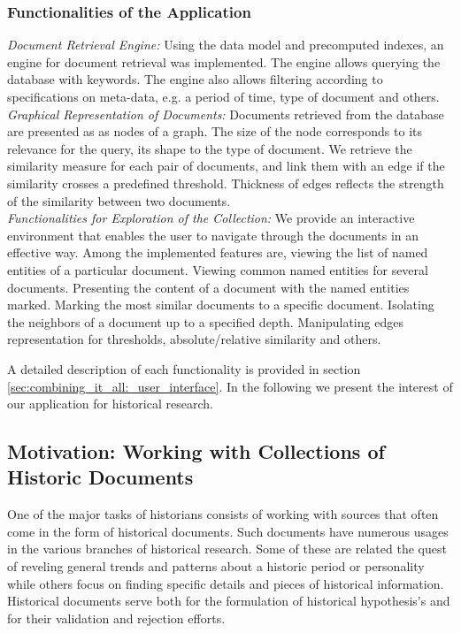 \subsubsection{Functionalities of the Application}

\emph{Document Retrieval Engine:} Using the data model and precomputed indexes, an engine for document retrieval was implemented. 
The engine allows querying the database with keywords. The engine also allows filtering according to specifications on meta-data, e.g. a period of time, type of document and others.\\ 
\emph{Graphical Representation of Documents:} Documents retrieved from the database are presented as as nodes of a graph. The size of the node corresponds to its relevance for the query, its shape to the type of document.  We retrieve the similarity measure for each pair of documents, and link them with an edge if the similarity crosses a predefined threshold. Thickness of edges reflects the strength of the similarity between two documents.\\
\emph{Functionalities for Exploration of the Collection:} We provide an interactive environment that enables the user to navigate through the documents in an effective way. Among the implemented features are, viewing the list of named entities of a particular document. Viewing common named entities for several documents. Presenting the content of a document with the named entities marked. Marking the most similar documents to a specific document. Isolating the neighbors of a document up to a specified depth. Manipulating edges representation for thresholds, absolute/relative similarity and others.

A detailed description of each functionality is provided in section \ref{sec:combining_it_all:_user_interface}. In the following we present the interest of our application for historical research. 

\subsection{Motivation: Working with Collections of Historic Documents}
\label{sec:motivation}
One of the major tasks of historians consists of working with sources that often come in the form of historical documents. 
Such documents have numerous usages in the various branches of historical research. Some of these are related the quest of reveling 
general trends and patterns about a historic period or personality while others focus on finding specific details and pieces of historical 
information. Historical documents serve both for the formulation of historical hypothesis's and for their validation and rejection efforts. 

